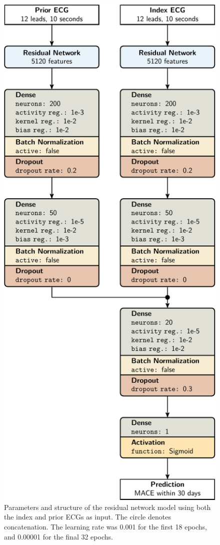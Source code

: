 \documentclass[preprint]{elsarticle}
\begin{document}
\begin{figure}[H]
\centering
\includegraphics[scale=\modelscale,keepaspectratio,trim=0 0 -16em 0]{figures/model-rn2.pdf}
\caption{Parameters and structure of the residual network model using both the index and prior ECGs as input. The circle denotes concatenation. The learning rate was 0.001 for the first 18 epochs, and 0.00001 for the final 32 epochs.}
\end{figure}
\end{document}
